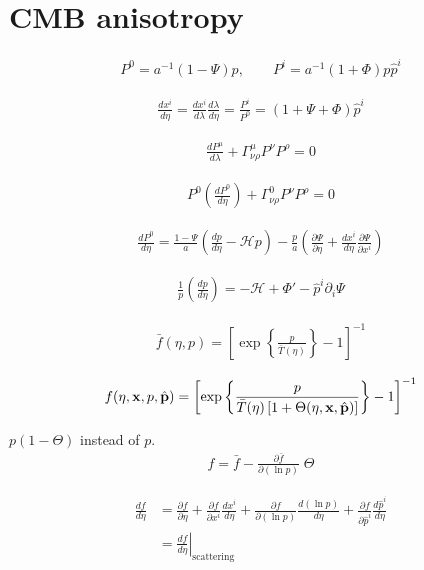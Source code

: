 \section{CMB anisotropy}

\begin{align}
	P^0 = a^{-1} (1 - \Psi)p, \qquad P^i = a^{-1}(1 + \Phi) p \hat{p}^i
\end{align}

\begin{align}
	\frac{dx^i}{d\eta} =  \frac{dx^i}{d\lambda} \frac{d\lambda}{d\eta} = \frac{P^i}{P^0} = (1+\Psi+\Phi)\hat{p}^i
\end{align}

\begin{align}
	\frac{dP^\mu}{d\lambda} + \Gamma^\mu_{\nu\rho} P^\nu P^\rho = 0
\end{align}

\begin{align}
	P^0 \left( \frac{dP^0}{d\eta} \right) + \Gamma^0_{\nu\rho} P^\nu P^\rho = 0
\end{align}

\begin{align}
	\frac{dP^0}{d\eta} = \frac{1-\Psi}{a} \left( \frac{dp}{d\eta} - \mathcal{H}p \right) - \frac{p}{a} \left( \frac{\partial\Psi}{\partial\eta} + \frac{dx^i}{d\eta} \frac{\partial\Psi}{\partial x^i}  \right) 
\end{align}

\begin{align}
	\frac{1}{p} \left( \frac{dp}{d\eta} \right) = - \mathcal{H} + \Phi' - \hat{p}^i \partial_i \Psi 
\end{align}

\begin{align}
	\bar{f}(\eta, p) = \left[ \exp \left\{ \frac{p}{\bar{T}(\eta)} \right\} - 1 \right]^{-1}
\end{align}

\begin{align}
	f(\eta, \mathbf{x}, p, \hat{\mathbf{p}}) = \left[ \exp \left\{ \frac{p}{\bar{T}(\eta)\left[1 + \Theta (\eta,\mathbf{x},\hat{\mathbf{p}}) \right]} \right\} - 1 \right]^{-1}
\end{align}

$p(1-\Theta)$ instead of $p$.
\begin{align}
	f = \bar{f} - \frac{\partial \bar{f}}{\partial (\ln p)} \; \Theta
\end{align}

\begin{align}
	\frac{df}{d\eta} &= \frac{\partial f}{\partial \eta} + \frac{\partial f}{\partial x^i}\frac{dx^i}{d\eta} + \frac{\partial f}{\partial(\ln  p)}\frac{d(\ln p)}{d\eta} + \frac{\partial f}{\partial \hat{p}^i}\frac{d\hat{p}^i}{d\eta} \\
	&= \left. \frac{df}{d\eta} \right|_\text{scattering}
\end{align}

